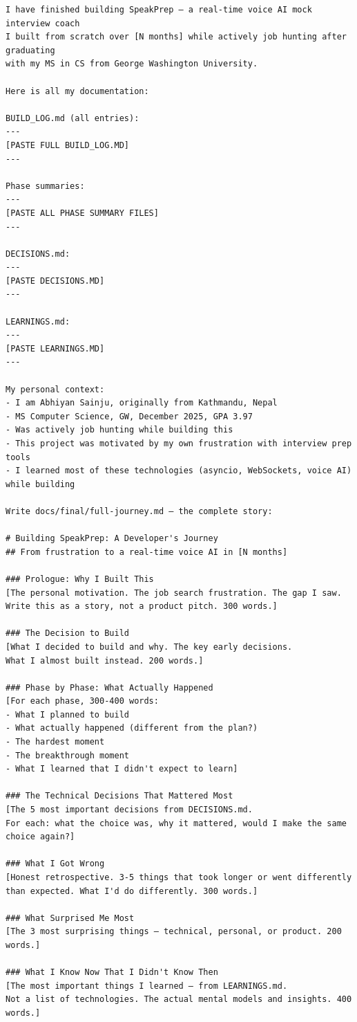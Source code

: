 \documentclass[
  11pt,
]{article}
\begin{document}
\begin{lstlisting}
I have finished building SpeakPrep — a real-time voice AI mock interview coach
I built from scratch over [N months] while actively job hunting after graduating
with my MS in CS from George Washington University.

Here is all my documentation:

BUILD_LOG.md (all entries):
---
[PASTE FULL BUILD_LOG.MD]
---

Phase summaries:
---
[PASTE ALL PHASE SUMMARY FILES]
---

DECISIONS.md:
---
[PASTE DECISIONS.MD]
---

LEARNINGS.md:
---
[PASTE LEARNINGS.MD]
---

My personal context:
- I am Abhiyan Sainju, originally from Kathmandu, Nepal
- MS Computer Science, GW, December 2025, GPA 3.97
- Was actively job hunting while building this
- This project was motivated by my own frustration with interview prep tools
- I learned most of these technologies (asyncio, WebSockets, voice AI) while building

Write docs/final/full-journey.md — the complete story:

# Building SpeakPrep: A Developer's Journey
## From frustration to a real-time voice AI in [N months]

### Prologue: Why I Built This
[The personal motivation. The job search frustration. The gap I saw.
Write this as a story, not a product pitch. 300 words.]

### The Decision to Build
[What I decided to build and why. The key early decisions.
What I almost built instead. 200 words.]

### Phase by Phase: What Actually Happened
[For each phase, 300-400 words:
- What I planned to build
- What actually happened (different from the plan?)
- The hardest moment
- The breakthrough moment
- What I learned that I didn't expect to learn]

### The Technical Decisions That Mattered Most
[The 5 most important decisions from DECISIONS.md.
For each: what the choice was, why it mattered, would I make the same choice again?]

### What I Got Wrong
[Honest retrospective. 3-5 things that took longer or went differently
than expected. What I'd do differently. 300 words.]

### What Surprised Me Most
[The 3 most surprising things — technical, personal, or product. 200 words.]

### What I Know Now That I Didn't Know Then
[The most important things I learned — from LEARNINGS.md.
Not a list of technologies. The actual mental models and insights. 400 words.]


\end{lstlisting}
\end{document}
